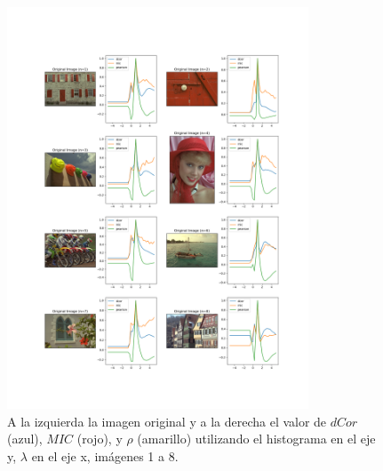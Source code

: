 \begin{figure}
    \centering
    \includegraphics[width=0.8\textwidth]{figuras/hist_comp_1.png}
    \caption{A la izquierda la imagen original y a la derecha el valor de $dCor$ (azul), $MIC$ (rojo), y $\rho$ (amarillo) utilizando el histograma en el eje y, $\lambda$ en el eje x, im\'agenes 1 a 8.}
\end{figure}

